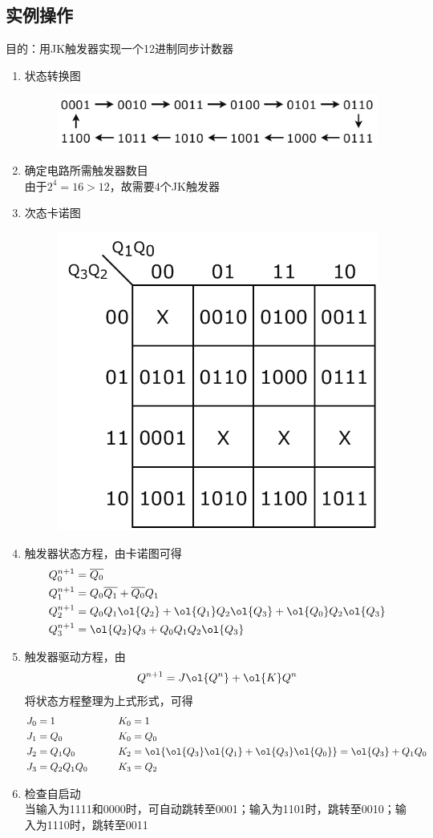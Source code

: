 \subsection{实例操作}
\par 目的：用JK触发器实现一个12进制同步计数器
\begin{enumerate}
    \item 状态转换图
    \begin{figure}[H]
        \centering
        \includegraphics[width=0.7\linewidth]{fig/12system_state.pdf}
    \end{figure}
    \item 确定电路所需触发器数目\\
    由于$2^4=16>12$，故需要$4$个JK触发器
    \item 次态卡诺图
    \begin{figure}[H]
        \centering
        \includegraphics[width=0.4\linewidth]{fig/Karnaugh_12system.pdf}
    \end{figure}
    \item 触发器状态方程，由卡诺图可得
    \[\begin{aligned}
    Q_0^{n+1}&=\overline{Q_0}\\
    Q_1^{n+1}&=Q_0\overline{Q_1}+\overline{Q_0}Q_1\\
    Q_2^{n+1}&=Q_0Q_1\ol{Q_2}+\ol{Q_1}Q_2\ol{Q_3}+\ol{Q_0}Q_2\ol{Q_3}\\
    Q_3^{n+1}&=\ol{Q_2}Q_3+Q_0Q_1Q_2\ol{Q_3}
    \end{aligned}\]
    \item 触发器驱动方程，由
    \[Q^{n+1}=J\ol{Q^n}+\ol{K}Q^n\]
    将状态方程整理为上式形式，可得
    \[\begin{aligned}
    J_0&=1 \qquad &K_0&=1\\
    J_1&=Q_0 \qquad &K_0&=Q_0\\
    J_2&=Q_1Q_0 \qquad &K_2&=\ol{\ol{Q_3}\ol{Q_1}+\ol{Q_3}\ol{Q_0}}=\ol{Q_3}+Q_1Q_0\\
    J_3&=Q_2Q_1Q_0 \qquad &K_3&=Q_2
    \end{aligned}\]
    \item 检查自启动\\
    当输入为1111和0000时，可自动跳转至0001；输入为1101时，跳转至0010；输入为1110时，跳转至0011
\end{enumerate}
